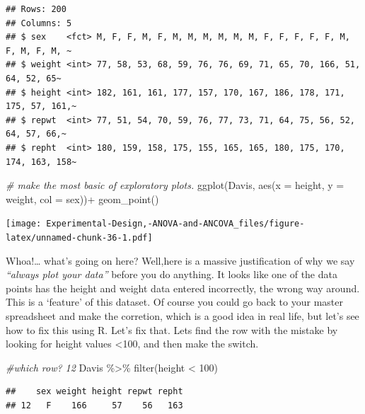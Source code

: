 \documentclass[
]{book}
\newenvironment{Shaded}{\begin{snugshade}}{\end{snugshade}}
\newcommand{\AttributeTok}[1]{\textcolor[rgb]{0.77,0.63,0.00}{#1}}
\newcommand{\CommentTok}[1]{\textcolor[rgb]{0.56,0.35,0.01}{\textit{#1}}}
\newcommand{\DecValTok}[1]{\textcolor[rgb]{0.00,0.00,0.81}{#1}}
\newcommand{\FunctionTok}[1]{\textcolor[rgb]{0.00,0.00,0.00}{#1}}
\newcommand{\NormalTok}[1]{#1}
\newcommand{\SpecialCharTok}[1]{\textcolor[rgb]{0.00,0.00,0.00}{#1}}
\begin{document}
\begin{verbatim}
## Rows: 200
## Columns: 5
## $ sex    <fct> M, F, F, M, F, M, M, M, M, M, M, F, F, F, F, F, M, F, M, F, M, ~
## $ weight <int> 77, 58, 53, 68, 59, 76, 76, 69, 71, 65, 70, 166, 51, 64, 52, 65~
## $ height <int> 182, 161, 161, 177, 157, 170, 167, 186, 178, 171, 175, 57, 161,~
## $ repwt  <int> 77, 51, 54, 70, 59, 76, 77, 73, 71, 64, 75, 56, 52, 64, 57, 66,~
## $ repht  <int> 180, 159, 158, 175, 155, 165, 165, 180, 175, 170, 174, 163, 158~
\end{verbatim}

\begin{Shaded}
\begin{Highlighting}[]
\CommentTok{\# make the most basic of exploratory plots.}
\FunctionTok{ggplot}\NormalTok{(Davis, }\FunctionTok{aes}\NormalTok{(}\AttributeTok{x =}\NormalTok{ height, }\AttributeTok{y =}\NormalTok{ weight, }\AttributeTok{col =}\NormalTok{ sex))}\SpecialCharTok{+}
  \FunctionTok{geom\_point}\NormalTok{()}
\end{Highlighting}
\end{Shaded}

\texttt{[image: Experimental-Design,-ANOVA-and-ANCOVA\_files/figure-latex/unnamed-chunk-36-1.pdf]}

Whoa!\ldots{} what's going on here? Well,here is a massive justification of why we say \emph{``always plot your data''} before you do anything. It looks like one of the data points has the height and weight data entered incorrectly, the wrong way around. This is a `feature' of this dataset. Of course you could go back to your master spreadsheet and make the corretion, which is a good idea in real life, but let's see how to fix this using R. Let's fix that. Lets find the row with the mistake by looking for height values \textless100, and then make the switch.

\begin{Shaded}
\begin{Highlighting}[]
\CommentTok{\#which row? 12}
\NormalTok{Davis }\SpecialCharTok{\%\textgreater{}\%} \FunctionTok{filter}\NormalTok{(height }\SpecialCharTok{\textless{}} \DecValTok{100}\NormalTok{)}
\end{Highlighting}
\end{Shaded}

\begin{verbatim}
##    sex weight height repwt repht
## 12   F    166     57    56   163
\end{verbatim}

\begin{Shaded}
\end{Shaded}
\end{document}
